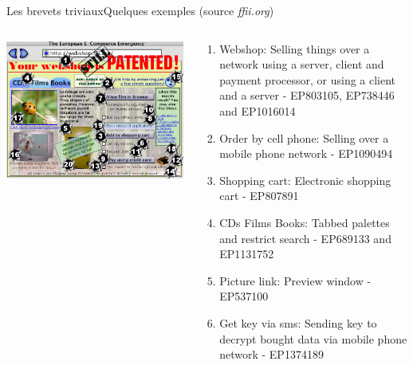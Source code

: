 \documentclass{beamer}
\begin{document}
\begin{frame}{Les brevets triviaux}{Quelques exemples (source \emph{ffii.org})}
    \begin{columns}[c]
        \begin{column}{.50\linewidth}
            \begin{center}
                \includegraphics[width=.99\linewidth]{images/webshop}
            \end{center}
        \end{column}
        \begin{column}{.50\linewidth}
            \begin{tiny}
                \begin{enumerate}
                    \item  Webshop: Selling things over a network using a server, client and payment processor, or using a client and a server - EP803105, EP738446 and EP1016014
                    \item Order by cell phone: Selling over a mobile phone network - EP1090494
                    \item Shopping cart: Electronic shopping cart - EP807891
                    \item CDs Films Books: Tabbed palettes and restrict search - EP689133 and EP1131752
                    \item Picture link: Preview window - EP537100
                    \item Get key via sms: Sending key to decrypt bought data via mobile phone network - EP1374189

\end{enumerate}
\end{tiny}
\end{column}
\end{columns}
\end{frame}
\end{document}
